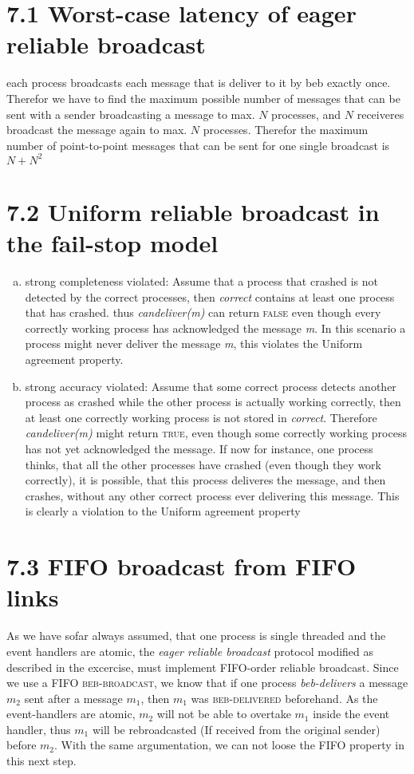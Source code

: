 \documentclass{article}
\begin{document}
	\pagestyle{fancy}
	
    \section*{7.1 Worst-case latency of eager reliable broadcast}
    each process broadcasts each message that is deliver to it by beb exactly once.
    Therefor we have to find the maximum possible number of messages that can be sent with a sender broadcasting a message to max. $N$ processes,
    and $N$ receiveres broadcast the message again to max. $N$ processes.
    Therefor the maximum number of point-to-point messages that can be sent for one single broadcast is $N + N^2$

    \section*{7.2 Uniform reliable broadcast in the fail-stop model}
    \begin{enumerate}[a)]
        \item strong completeness violated: Assume that a process that crashed is not detected by the correct processes,
        then \textit{correct} contains at least one process that has crashed.
        thus \textit{candeliver(m)} can return \textsc{false} even though every correctly working process has acknowledged the message \textit{m}.
        In this scenario a process might never deliver the message \textit{m}, this violates the Uniform agreement property.
        
        \item strong accuracy violated: Assume that some correct process detects another process as crashed while the other process is actually working correctly,
        then at least one correctly working process is not stored in \textit{correct}.
        Therefore \textit{candeliver(m)} might return \textsc{true}, even though some correctly working process has not yet acknowledged the message.
        If now for instance, one process thinks, that all the other processes have crashed (even though they work correctly), it is possible, that this process deliveres the message, and then crashes, without any other correct process ever delivering this message.
        This is clearly a violation to the Uniform agreement property
    \end{enumerate}
    \section*{7.3 FIFO broadcast from FIFO links}
    As we have sofar always assumed, that one process is single threaded and the event handlers are atomic, the \textit{eager reliable broadcast} protocol modified as described in the excercise,
    must implement FIFO-order reliable broadcast.
    Since we use a FIFO \textsc{beb-broadcast}, we know that if one process \textit{beb-delivers} a message $m_2$ sent after a message $m_1$, then $m_1$ was \textsc{beb-delivered} beforehand.
    As the event-handlers are atomic, $m_2$ will not be able to overtake $m_1$ inside the event handler, thus $m_1$ will be rebroadcasted (If received from the original sender) before $m_2$.
    With the same argumentation, we can not loose the FIFO property in this next step. 
\end{document}
